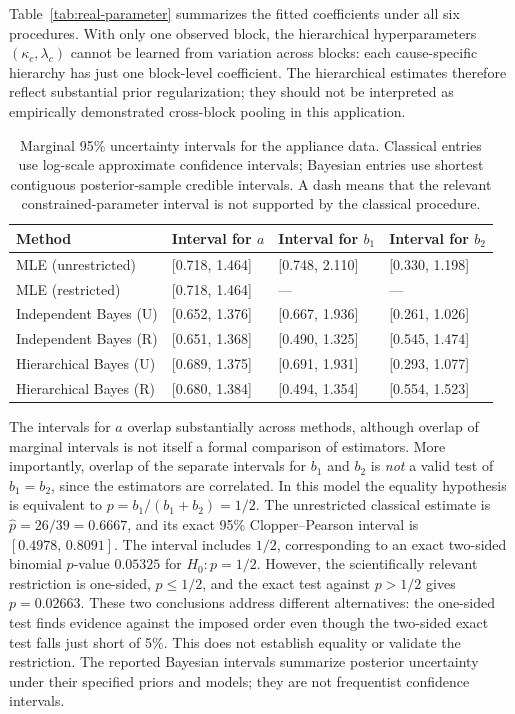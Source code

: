 \documentclass[a4paper,11pt]{article}
\begin{document}
Table~\ref{tab:real-parameter} summarizes the fitted coefficients under all six procedures. With only one observed block, the hierarchical hyperparameters $(\kappa_c,\lambda_c)$ cannot be learned from variation across blocks: each cause-specific hierarchy has just one block-level coefficient. The hierarchical estimates therefore reflect substantial prior regularization; they should not be interpreted as empirically demonstrated cross-block pooling in this application.

\begin{table}[htbp]
\centering\scriptsize
\caption{Marginal 95\% uncertainty intervals for the appliance data. Classical entries use log-scale approximate confidence intervals; Bayesian entries use shortest contiguous posterior-sample credible intervals. A dash means that the relevant constrained-parameter interval is not supported by the classical procedure.}\label{tab:real-intervals}
\begin{tabular}{llll}\hline
Method & Interval for $a$ & Interval for $b_1$ & Interval for $b_2$\\\hline
MLE (unrestricted) & [0.718, 1.464] & [0.748, 2.110] & [0.330, 1.198]\\
MLE (restricted) & [0.718, 1.464] & --- & ---\\
Independent Bayes (U) & [0.652, 1.376] & [0.667, 1.936] & [0.261, 1.026]\\
Independent Bayes (R) & [0.651, 1.368] & [0.490, 1.325] & [0.545, 1.474]\\
Hierarchical Bayes (U) & [0.689, 1.375] & [0.691, 1.931] & [0.293, 1.077]\\
Hierarchical Bayes (R) & [0.680, 1.384] & [0.494, 1.354] & [0.554, 1.523]\\\hline
\end{tabular}
\end{table}

The intervals for $a$ overlap substantially across methods, although overlap of marginal intervals is not itself a formal comparison of estimators. More importantly, overlap of the separate intervals for $b_1$ and $b_2$ is \emph{not} a valid test of $b_1=b_2$, since the estimators are correlated. In this model the equality hypothesis is equivalent to $p=b_1/(b_1+b_2)=1/2$. The unrestricted classical estimate is $\widehat p=26/39=0.6667$, and its exact 95\% Clopper--Pearson interval is $[0.4978,\,0.8091]$. The interval includes $1/2$, corresponding to an exact two-sided binomial $p$-value $0.05325$ for $H_0:p=1/2$. However, the scientifically relevant restriction is one-sided, $p\le1/2$, and the exact test against $p>1/2$ gives $p=0.02663$. These two conclusions address different alternatives: the one-sided test finds evidence against the imposed order even though the two-sided exact test falls just short of 5\%. This does not establish equality or validate the restriction. The reported Bayesian intervals summarize posterior uncertainty under their specified priors and models; they are not frequentist confidence intervals.
\end{document}
